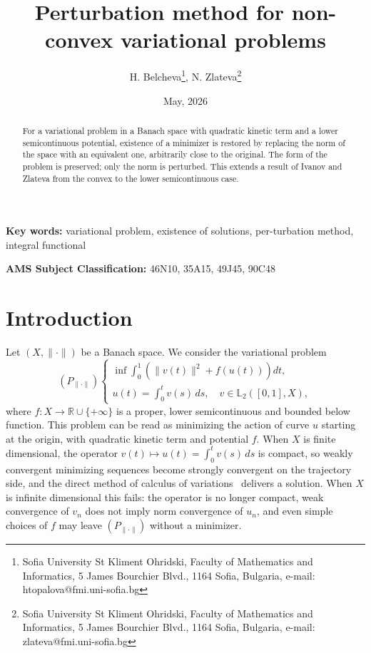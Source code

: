 \documentclass[12pt,leqno]{article}
\title{Perturbation method for non-convex variational problems}
\author{H. Belcheva\footnote{Sofia University St Kliment Ohridski, Faculty of Mathematics and Informatics, 5 James Bourchier Blvd., 1164 Sofia, Bulgaria, e-mail: htopalova@fmi.uni-sofia.bg}, N. Zlateva\footnote{Sofia University St Kliment Ohridski, Faculty of Mathematics and Informatics, 5 James Bourchier Blvd., 1164 Sofia, Bulgaria, e-mail: zlateva@fmi.uni-sofia.bg}}
\date{May, 2026}
\theoremstyle{definition}
\theoremstyle{remark}
\def\ds{\displaystyle}
\def\R{\mathbb{R}}
\def\L{\mathbb{L}}
\begin{document}
\maketitle

\begin{abstract}
For a variational problem in a Banach space with quadratic kinetic term and a lower semicontinuous potential, existence of a minimizer is restored by replacing the norm of the space with an equivalent one, arbitrarily close to the original. The form of the problem is preserved; only the norm is perturbed. This extends a result of Ivanov and Zlateva from the convex to the lower semicontinuous case.
\end{abstract}

\textbf{Key words:} variational problem, existence of solutions, per-tur\-bation method, integral functional

\textbf{AMS Subject Classification:} 46N10, 35A15, 49J45, 90C48

\section{Introduction}

Let $(X,\|\cdot\|)$ be a Banach space. We consider the variational problem
\begin{equation}\label{problem-1}
    \left(P_{\|\cdot\|}\right)\left\{\begin{array}{l}
    \ds \inf \int_0^1 \left(\|v(t)\|^2+f(u(t))\right) dt, \\[12pt]
    \ds u(t)=\int_0^t v(s)\, ds, \quad v \in \L_2([0, 1], X),
\end{array}\right.
\end{equation}
where $f:X\to \R\cup\{+\infty\}$ is a proper, lower semicontinuous and bounded below function. This problem can be read as minimizing the action of curve $u$ starting at the origin, with quadratic kinetic term and potential $f$. When $X$ is finite dimensional, the operator $v(t)\mapsto u(t)=\int_0^t v(s)\,ds$ is compact, so weakly convergent minimizing sequences become strongly convergent on the trajectory side, and the direct method of calculus of variations~\cite{clarke_functional_analysis,dacorogna_direct_methods,giusti_direct_methods} delivers a solution. When $X$ is infinite dimensional this fails: the operator is no longer compact, weak convergence of $v_n$ does not imply norm convergence of $u_n$, and even simple choices of $f$ may leave $(P_{\|\cdot\|})$ without a minimizer.
\end{document}
